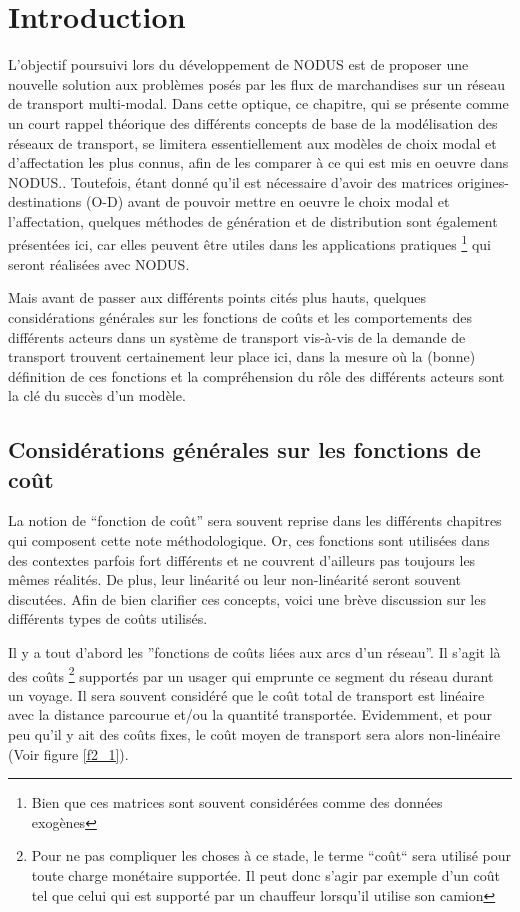 
\section{Introduction}



L'objectif poursuivi lors du développement de NODUS est de proposer une nouvelle
solution aux problèmes posés par les flux de marchandises sur un réseau de
transport multi-modal. Dans cette optique, ce chapitre, qui se présente comme un
court rappel théorique des différents concepts de base de la modélisa\-tion des
réseaux de transport, se limitera essentiellement aux modèles de choix modal et
d'affectation les plus connus, afin de les comparer à ce qui est mis en oeuvre
dans NODUS.. Toutefois, étant donné qu'il est nécessaire d'avoir des matrices
origines-destinations (O-D) avant de pouvoir mettre en oeuvre le choix modal et
l'affectation, quelques méthodes de génération et de distribution sont également
présentées ici, car elles peuvent être utiles dans les applications pratiques
\footnote{Bien que ces matrices sont souvent considérées comme des données
exogènes} qui seront réalisées avec NODUS.


Mais avant de passer aux différents points cités plus hauts, quelques
con\-si\-dé\-ra\-tions générales sur les fonctions de coûts et les comportements
des différents acteurs dans un système de transport vis-à-vis de la demande de
transport trouvent certainement leur place ici, dans la mesure où la (bonne)
définition de ces fonctions et la compréhension du rôle des différents acteurs
sont la clé du succès d'un modèle.



\subsection{Consid\'erations g\'en\'erales sur les fonctions de co\^ut}




La notion de  ``fonction de coût'' sera souvent reprise  dans les différents
chapitres qui composent cette note méthodologique. Or, ces fonctions sont utilisées
dans des contextes parfois fort différents et ne couvrent d'ailleurs pas
toujours les mêmes réalités. De plus, leur linéarité ou leur non-linéarité
seront souvent discutées. Afin de bien clarifier ces concepts, voici une brève
discussion sur les différents types de coûts utilisés.



Il y a tout d'abord les ''fonctions de coûts liées aux arcs d'un réseau''. Il
s'agit là des coûts%
\footnote{Pour ne pas compliquer les choses à ce stade, le terme ``coût`` sera
utilisé pour toute charge monétaire supportée. Il peut donc s'agir par exemple
d'un coût tel que celui qui est supporté par un chauffeur lorsqu'il utilise son
camion} supportés par un usager qui emprunte ce segment du réseau durant un
voyage. Il sera souvent considéré que le coût total de transport est linéaire
avec la distance parcourue et/ou la quantité transportée. Evidemment, et pour
peu qu'il y ait des coûts fixes, le coût moyen de transport sera alors
non-linéaire (Voir figure \ref{f2_1}).

